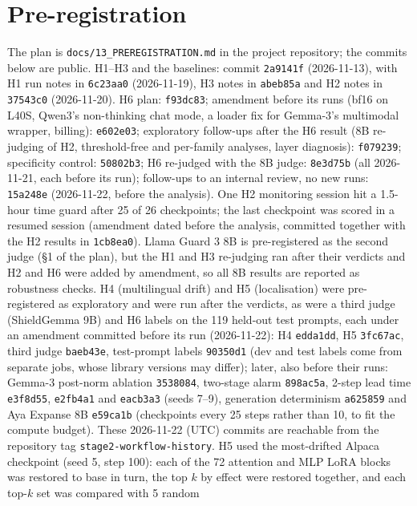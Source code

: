 \documentclass[11pt]{article}
\begin{document}
\section{Pre-registration}
\label{app:prereg}

The plan is \texttt{docs/13\_PREREGISTRATION.md} in the project repository; the commits below are public. H1--H3 and
the baselines: commit \texttt{2a9141f} (2026-11-13), with H1 run notes in \texttt{6c23aa0} (2026-11-19), H3 notes in
\texttt{abeb85a} and H2 notes in \texttt{37543c0} (2026-11-20). H6 plan: \texttt{f93dc83}; amendment before its runs
(bf16 on L40S, Qwen3's non-thinking chat mode, a loader fix for Gemma-3's multimodal wrapper, billing):
\texttt{e602e03}; exploratory follow-ups after the H6 result (8B re-judging of H2, threshold-free and per-family
analyses, layer diagnosis): \texttt{f079239}; specificity control: \texttt{50802b3}; H6 re-judged with the 8B judge:
\texttt{8e3d75b} (all 2026-11-21, each before its run); follow-ups to an internal review, no new runs: \texttt{15a248e}
(2026-11-22, before the analysis). One H2 monitoring session hit a 1.5-hour time guard
after 25 of 26 checkpoints; the last checkpoint was scored in a resumed session (amendment dated before the analysis,
committed together with the H2 results in \texttt{1cb8ea0}). Llama Guard 3 8B is pre-registered as the second judge (\S1 of the plan), but the H1 and H3 re-judging ran after
their verdicts and H2 and H6 were added by amendment, so all 8B results are reported as robustness checks.
H4 (multilingual drift) and H5 (localisation) were pre-registered as exploratory and were run after the verdicts,
as were a third judge (ShieldGemma 9B) and H6 labels on the 119 held-out test prompts, each under an amendment
committed before its run (2026-11-22): H4 \texttt{edda1dd}, H5 \texttt{3fc67ac}, third judge \texttt{baeb43e},
test-prompt labels \texttt{90350d1} (dev and test labels come from separate jobs, whose library versions may differ);
later, also before their runs: Gemma-3 post-norm ablation \texttt{3538084}, two-stage alarm \texttt{898ac5a},
2-step lead time \texttt{e3f8d55}, \texttt{e2fb4a1} and \texttt{eacb3a3} (seeds 7--9), generation determinism
\texttt{a625859} and Aya Expanse 8B \texttt{e59ca1b} (checkpoints every 25 steps rather than 10, to fit the compute
budget). These 2026-11-22 (UTC) commits are reachable from the repository tag \texttt{stage2-workflow-history}.
H5 used the most-drifted Alpaca checkpoint (seed 5, step 100): each of the 72 attention and MLP LoRA blocks was
restored to base in turn, the top $k$ by effect were restored together, and each top-$k$ set was compared with 5 random
\end{document}
